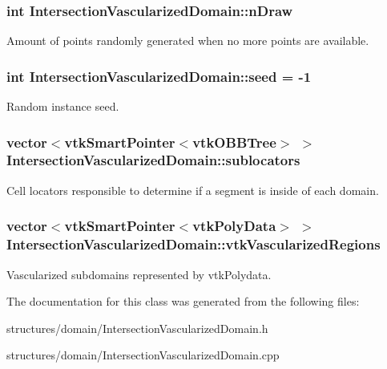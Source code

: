 \subsubsection[{\texorpdfstring{n\+Draw}{nDraw}}]{\setlength{\rightskip}{0pt plus 5cm}int Intersection\+Vascularized\+Domain\+::n\+Draw\hspace{0.3cm}{\ttfamily [private]}}\hypertarget{class_intersection_vascularized_domain_a98a16d98d16b37b13593d7a2aee872f3}{}\label{class_intersection_vascularized_domain_a98a16d98d16b37b13593d7a2aee872f3}
Amount of points randomly generated when no more points are available. 
\subsubsection[{\texorpdfstring{seed}{seed}}]{\setlength{\rightskip}{0pt plus 5cm}int Intersection\+Vascularized\+Domain\+::seed = -\/1\hspace{0.3cm}{\ttfamily [private]}}\hypertarget{class_intersection_vascularized_domain_abe078f4d223d21554d6f6709d5db47b0}{}\label{class_intersection_vascularized_domain_abe078f4d223d21554d6f6709d5db47b0}
Random instance seed. 
\subsubsection[{\texorpdfstring{sublocators}{sublocators}}]{\setlength{\rightskip}{0pt plus 5cm}vector$<$vtk\+Smart\+Pointer$<$vtk\+O\+B\+B\+Tree$>$ $>$ Intersection\+Vascularized\+Domain\+::sublocators\hspace{0.3cm}{\ttfamily [private]}}\hypertarget{class_intersection_vascularized_domain_aedf9a331b6785010abad7111b447a418}{}\label{class_intersection_vascularized_domain_aedf9a331b6785010abad7111b447a418}
Cell locators responsible to determine if a segment is inside of each domain. 
\subsubsection[{\texorpdfstring{vtk\+Vascularized\+Regions}{vtkVascularizedRegions}}]{\setlength{\rightskip}{0pt plus 5cm}vector$<$vtk\+Smart\+Pointer$<$vtk\+Poly\+Data$>$ $>$ Intersection\+Vascularized\+Domain\+::vtk\+Vascularized\+Regions\hspace{0.3cm}{\ttfamily [private]}}\hypertarget{class_intersection_vascularized_domain_a0cfc67dad7db0d7c95b50eb6992c8339}{}\label{class_intersection_vascularized_domain_a0cfc67dad7db0d7c95b50eb6992c8339}
Vascularized subdomains represented by vtk\+Polydata. 

The documentation for this class was generated from the following files\+:\begin{DoxyCompactItemize}
\item 
structures/domain/Intersection\+Vascularized\+Domain.\+h\item 
structures/domain/Intersection\+Vascularized\+Domain.\+cpp\end{DoxyCompactItemize}
